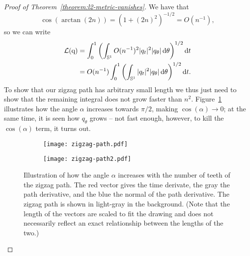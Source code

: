 \message{ !name(mainfile.tex)}\documentclass[a4,danish]{article}
\begin{document}
\begin{proof}[Proof of Theorem~\ref{theorem:l2-metric-vanishes}]
  We have that
  \begin{equation*}
    \cos(\arctan(2n)) = (1+(2n)^2)^{-1/2}
    = O(n^{-1}),
  \end{equation*}
  so we can write
  \begin{equation}
    \label{eq:approx-L-angle}
    \begin{aligned}
    \mathcal{L}( \mathrm{q} )
    & =
      \int_{0}^{1}
      \left(
      \int_{\mathbb{S}^{1}}
      O(n^{-1})^2
      | q _t|^2   | q _{\theta}|
      \mathop{}\!\mathrm{d} \theta
      \right)^{1/2} \mathop{}\!\mathrm{d} t \\
    & =
      O(n^{-1})
      \int_{0}^{1}
      \left(
      \int_{\mathbb{S}^{1}}
      | q _t|^2   | q _{\theta}|
      \mathop{}\!\mathrm{d} \theta
      \right)^{1/2} \mathop{}\!\mathrm{d} t.
    \end{aligned}
  \end{equation}
  To show that our zigzag path has arbitrary small length we thus just need to show that the remaining integral does not grow faster than $n^{2}$. Figure~\ref{fig:zigzag-path-angle} illustrates how the angle $\alpha$ increases towards $\pi/2$, making $\cos(\alpha) \rightarrow 0$; at the same time, it is seen how $q_{\theta}$ grows -- not fast enough, however, to kill the $\cos(\alpha)$ term, it turns out.

\begin{figure}
  \centering
  \begin{subfigure}{.49\textwidth}
    \centering
    \texttt{[image: zigzag-path.pdf]}
  \end{subfigure}
  \begin{subfigure}{.49\textwidth}
    \centering
    \texttt{[image: zigzag-path2.pdf]}
  \end{subfigure}
  \caption{Illustration of how the angle $\alpha$ increases with the number of teeth of the zigzag path. The red vector gives the time derivate, the gray the path derivative, and the blue the normal of the path derivative. The zigzag path is shown in light-gray in the background. (Note that the length of the vectors are scaled to fit the drawing and does not necessarily reflect an exact relationship between the lengths of the two.)}
  \label{fig:zigzag-path-angle}
\end{figure}


\end{proof}
\end{document}
